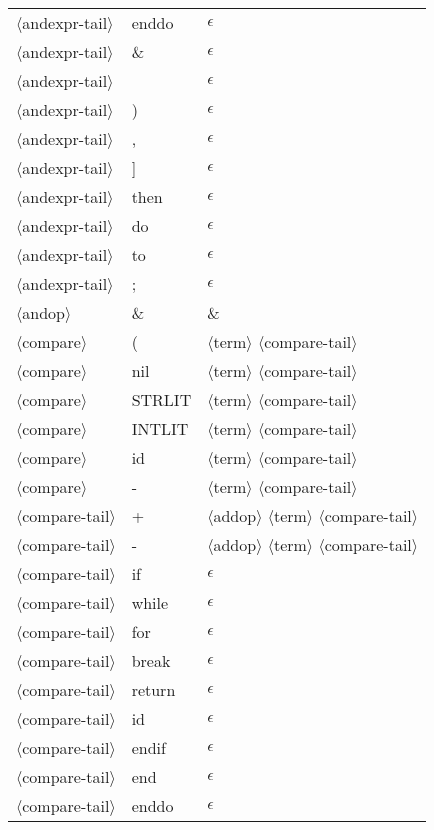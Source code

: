 \documentclass[11pt, fleqn]{article}
\newcommand{\atag}[1]{$\langle$#1$\rangle$}
\begin{document}
\begin{longtable}{l|l|l}
\atag{andexpr-tail}				&	enddo		&	$\epsilon$	\\
\atag{andexpr-tail}				&	\&			&	$\epsilon$	\\
\atag{andexpr-tail}				&	\textbar		&	$\epsilon$	\\
\atag{andexpr-tail}				&	)			&	$\epsilon$	\\
\atag{andexpr-tail}				&	,			&	$\epsilon$	\\
\atag{andexpr-tail}				&	]			&	$\epsilon$	\\
\atag{andexpr-tail}				&	then			&	$\epsilon$	\\
\atag{andexpr-tail}				&	do			&	$\epsilon$	\\
\atag{andexpr-tail}				&	to			&	$\epsilon$	\\
\atag{andexpr-tail}				&	;			&	$\epsilon$	\\
\atag{andop}						&	\&			&	\&										\\
\atag{compare} 					&	(			&	\atag{term} \atag{compare-tail}	\\
\atag{compare} 					&	nil			&	\atag{term} \atag{compare-tail}	\\
\atag{compare} 					&	STRLIT		&	\atag{term} \atag{compare-tail}	\\
\atag{compare} 					&	INTLIT		&	\atag{term} \atag{compare-tail}	\\
\atag{compare} 					&	id			&	\atag{term} \atag{compare-tail}	\\
\atag{compare} 					&	-			&	\atag{term} \atag{compare-tail}	\\
\atag{compare-tail}				&	+			&	\atag{addop} \atag{term} \atag{compare-tail}	\\
\atag{compare-tail}				&	-			&	\atag{addop} \atag{term} \atag{compare-tail}	\\
\atag{compare-tail}				&	if			&	$\epsilon$					\\
\atag{compare-tail}				&	while			&	$\epsilon$					\\
\atag{compare-tail}				&	for			&	$\epsilon$					\\
\atag{compare-tail}				&	break			&	$\epsilon$					\\
\atag{compare-tail}				&	return			&	$\epsilon$					\\
\atag{compare-tail}				&	id			&	$\epsilon$					\\
\atag{compare-tail}				&	endif			&	$\epsilon$					\\
\atag{compare-tail}				&	end			&	$\epsilon$					\\
\atag{compare-tail}				&	enddo		&	$\epsilon$					\\

\end{longtable}
\end{document}
